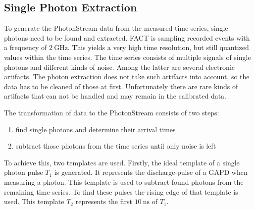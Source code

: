 \subsection{Single Photon Extraction}
%
To generate the PhotonStream data from the measured time series, single photons
need to be found and extracted. FACT is sampling recorded events with a
frequency of $\SI{2}{\giga\hertz}$. This yields a very high time resolution, but still quantized values within the time series. The time series consists of multiple signals
of single photons and different kinds of noise. Among the latter are several
electronic artifacts. The photon extraction does not take such artifacts into
account, so the data has to be cleaned of those at first. Unfortunately there
are rare kinds of artifacts that can not be handled and may remain in the
calibrated data.

The transformation of data to the PhotonStream consists of two steps:
%
\begin{enumerate}
  \item find single photons and determine their arrival times
  \item subtract those photons from the time series until only noise is left
\end{enumerate}
%
To achieve this, two templates are used. Firstly, the ideal template of a
single photon pulse $T_1$ is generated. It represents the discharge-pulse of a
GAPD when measuring a photon. This template is used to subtract found photons
from the remaining time series. To find these pulses the rising edge of that
template is used. This template $T_2$ represents the first
$\SI{10}{\nano\second}$ of $T_1$.

